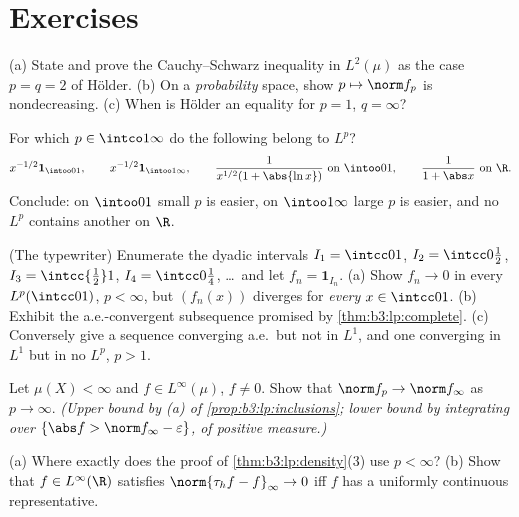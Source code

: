 \section{Exercises}

\begin{exercise}[$\star$]\label{exo:b3:lp:1}
(a) State and prove the Cauchy--Schwarz inequality in
$L^2(\mu)$ as the case $p = q = 2$ of H\"older.
(b) On a \emph{probability} space, show $p \mapsto \norm f_p$
is nondecreasing.
(c) When is H\"older an equality for $p = 1$, $q = \infty$?
\end{exercise}

\begin{exercise}[$\star$]\label{exo:b3:lp:2}
For which $p \in \intco1\infty$ do the following belong to
$L^p$?
\[
x^{-1/2}\mathbf 1_{\intoo01},\qquad
x^{-1/2}\mathbf 1_{\intoo1\infty},\qquad
\frac{1}{x^{1/2}(1 + \abs{\ln x})}\ \text{on } \intoo01,
\qquad
\frac1{1 + \abs x}\ \text{on } \R .
\]
Conclude: on $\intoo01$ small $p$ is easier, on
$\intoo1\infty$ large $p$ is easier, and no $L^p$ contains
another on $\R$.
\end{exercise}

\begin{exercise}[$\star\star$]\label{exo:b3:lp:3}
(The typewriter) Enumerate the dyadic intervals $I_1 =
\intcc01$, $I_2 = \intcc0{\frac12}$, $I_3 = \intcc{\frac12}1$,
$I_4 = \intcc0{\frac14}$, \dots\ and let $f_n = \mathbf
1_{I_n}$.
(a) Show $f_n \to 0$ in every $L^p(\intcc01)$, $p < \infty$,
but $(f_n(x))$ diverges for \emph{every} $x \in \intcc01$.
(b) Exhibit the a.e.-convergent subsequence promised by
\cref{thm:b3:lp:complete}.
(c) Conversely give a sequence converging a.e.\ but not in
$L^1$, and one converging in $L^1$ but in no $L^p$, $p > 1$.
\end{exercise}

\begin{exercise}[$\star\star$]\label{exo:b3:lp:4}
Let $\mu(X) < \infty$ and $f \in L^\infty(\mu)$, $f \neq 0$.
Show that $\norm f_p \to \norm f_\infty$ as $p \to \infty$.
\emph{(Upper bound by (a) of \cref{prop:b3:lp:inclusions};
lower bound by integrating over $\{\abs f > \norm f_\infty -
\varepsilon\}$, of positive measure.)}
\end{exercise}

\begin{exercise}[$\star\star$]\label{exo:b3:lp:5}
(a) Where exactly does the proof of
\cref{thm:b3:lp:density}(3) use $p < \infty$?
(b) Show that $f \in L^\infty(\R)$ satisfies $\norm{\tau_hf -
f}_\infty \to 0$ iff $f$ has a uniformly continuous
representative.
\end{exercise}

